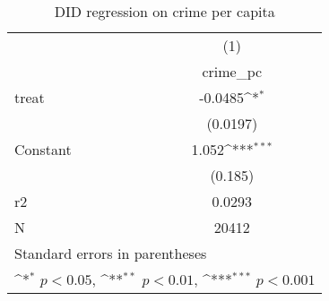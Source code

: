 \begin{table}[htbp]\centering
\def\sym#1{\ifmmode^{#1}\else\(^{#1}\)\fi}
\caption{DID regression on crime per capita}
\begin{tabular}{l*{1}{c}}
\hline\hline
                    &\multicolumn{1}{c}{(1)}\\
                    &\multicolumn{1}{c}{crime\_pc}\\
\hline
treat               &     -0.0485\sym{*}  \\
                    &    (0.0197)         \\
[1em]
Constant            &       1.052\sym{***}\\
                    &     (0.185)         \\
\hline
r2                  &      0.0293         \\
N                   &       20412         \\
\hline\hline
\multicolumn{2}{l}{\footnotesize Standard errors in parentheses}\\
\multicolumn{2}{l}{\footnotesize \sym{*} \(p<0.05\), \sym{**} \(p<0.01\), \sym{***} \(p<0.001\)}\\
\end{tabular}
\end{table}
